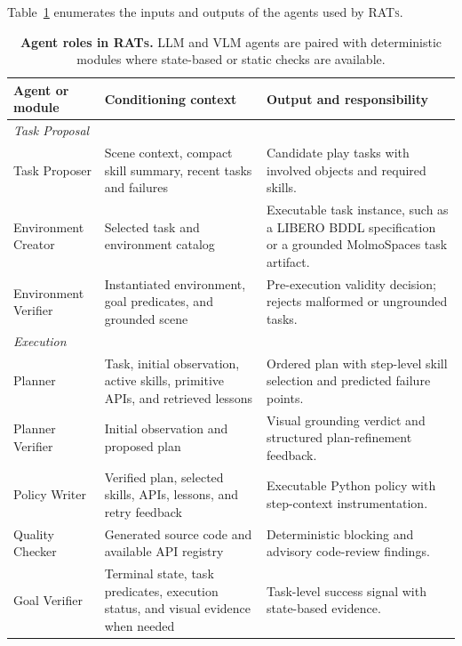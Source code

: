 Table~\ref{tab:agent_prompt_contracts} enumerates the inputs and outputs of the
agents used by \textsc{RATs}. 
\begin{table}[t]
\centering
\small
\caption{
\textbf{Agent roles in \textsc{RATs}.}
LLM and VLM agents are paired with deterministic modules where state-based or
static checks are available.
}
\vspace{1.5em}
\label{tab:agent_prompt_contracts}
\begin{tabular}{p{} p{} p{}}
\toprule
\textbf{Agent or module} & \textbf{Conditioning context} & \textbf{Output and responsibility} \\
\midrule
\multicolumn{3}{l}{\textit{Task Proposal}} \\
\midrule
Task Proposer &
Scene context, compact skill summary, recent tasks and failures &
Candidate play tasks with involved objects and required skills. \\

Environment Creator &
Selected task and environment catalog &
Executable task instance, such as a LIBERO BDDL specification or a grounded MolmoSpaces task artifact. \\

Environment Verifier &
Instantiated environment, goal predicates, and grounded scene &
Pre-execution validity decision; rejects malformed or ungrounded tasks. \\

\midrule
\multicolumn{3}{l}{\textit{Execution}} \\
\midrule
Planner &
Task, initial observation, active skills, primitive APIs, and retrieved lessons &
Ordered plan with step-level skill selection and predicted failure points. \\

Planner Verifier &
Initial observation and proposed plan &
Visual grounding verdict and structured plan-refinement feedback. \\

Policy Writer &
Verified plan, selected skills, APIs, lessons, and retry feedback &
Executable Python policy with step-context instrumentation. \\

Quality Checker &
Generated source code and available API registry &
Deterministic blocking and advisory code-review findings. \\

Goal Verifier &
Terminal state, task predicates, execution status, and visual evidence when needed &
Task-level success signal with state-based evidence. \\


\end{tabular}
\end{table}
